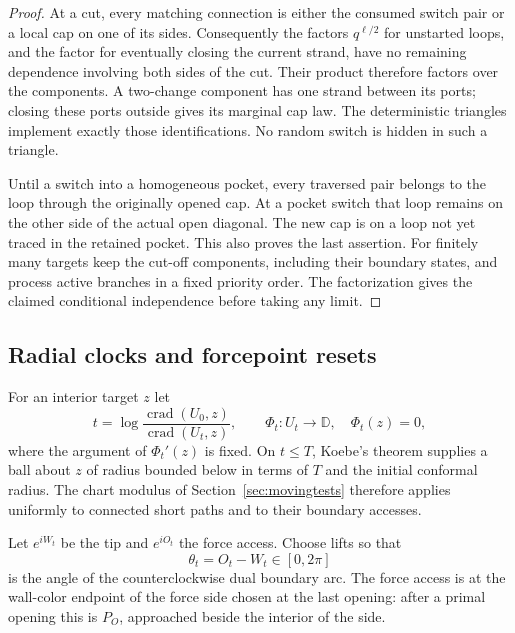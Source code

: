 \begin{proof}
At a cut, every matching connection is either the consumed switch pair
or a local cap on one of its sides.  Consequently the factors
$q^{\ell/2}$ for unstarted loops, and the factor for eventually closing
the current strand, have no remaining dependence involving both sides
of the cut.  Their product therefore factors over the components.  A
two-change component has one strand between its ports; closing these
ports outside gives its marginal cap law.  The deterministic triangles
implement exactly those identifications.  No random switch is hidden
in such a triangle.

Until a switch into a homogeneous pocket, every traversed pair belongs
to the loop through the originally opened cap.  At a pocket switch
that loop remains on the other side of the actual open diagonal.
The new cap is on a loop not yet traced in the retained pocket.  This
also proves the last assertion.  For finitely many targets keep the
cut-off components, including their boundary states, and process active
branches in a fixed priority order.  The factorization gives the claimed
conditional independence before taking any limit.
\end{proof}


\subsection{Radial clocks and forcepoint resets}
\label{peel:radial}

For an interior target $z$ let
\[
 t=\log\frac{\operatorname{crad}(U_0,z)}
                    {\operatorname{crad}(U_t,z)},
 \qquad \Phi_t:U_t\longrightarrow\mathbb D,
 \quad \Phi_t(z)=0,
\]
where the argument of $\Phi_t'(z)$ is fixed.  On $t\le T$, Koebe's
theorem supplies a ball about $z$ of radius bounded below in terms of
$T$ and the initial conformal radius.  The chart modulus of
Section~\ref{sec:movingtests} therefore applies uniformly to connected
short paths and to their boundary accesses.

Let $e^{iW_t}$ be the tip and $e^{iO_t}$ the force access.  Choose lifts
so that
\begin{equation}\label{peel:angle}
 \theta_t=O_t-W_t\in[0,2\pi]
\end{equation}
is the angle of the counterclockwise dual boundary arc.  The force
access is at the wall-color endpoint of the force side chosen at the
last opening: after a primal opening this is $P_O$, approached beside
the interior of the side.

